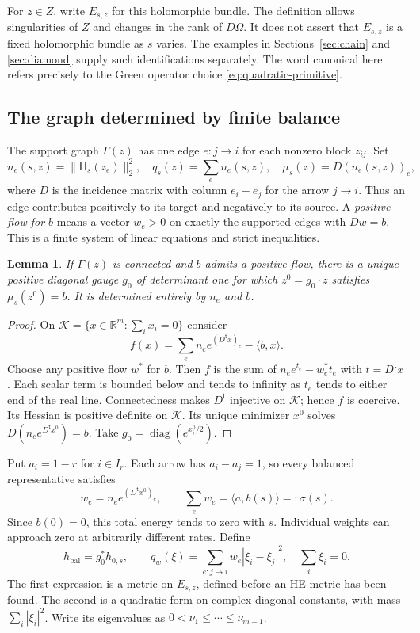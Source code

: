 \documentclass[11pt]{amsart}
\newtheorem{lemma}[theorem]{Lemma}
\theoremstyle{definition}
\theoremstyle{remark}
\newcommand{\RR}{\mathbb R}
\newcommand{\diag}{\operatorname{diag}}
\newcommand{\HH}{\mathsf H}
\newcommand{\cK}{\mathcal K}
\begin{document}
For $z\in Z$, write $E_{s,z}$ for this holomorphic bundle. The definition
allows singularities of $Z$ and changes in the rank of $D\Omega$. It does
not assert that $E_{s,z}$ is a fixed holomorphic bundle as $s$ varies.
The examples in Sections~\ref{sec:chain} and \ref{sec:diamond} supply
such identifications separately. The word canonical here refers precisely
to the Green operator choice \eqref{eq:quadratic-primitive}.

\subsection{The graph determined by finite balance}
The support graph $\Gamma(z)$ has one edge $e:j\to i$ for each nonzero
block $z_{ij}$. Set
\[
 n_e(s,z)=\|\HH_s(z_e)\|_2^2,\quad q_s(z)=\sum_en_e(s,z),
 \quad \mu_s(z)=D(n_e(s,z))_e,
\]
where $D$ is the incidence matrix with column $e_i-e_j$ for the arrow
$j\to i$. Thus an edge contributes positively to its target and negatively
to its source. A \emph{positive flow for $b$} means a vector $w_e>0$ on
exactly the supported edges with $Dw=b$. This is a finite system of
linear equations and strict inequalities.

\begin{lemma}\label{lem:balance}
If $\Gamma(z)$ is connected and $b$ admits a positive flow, there is a
unique positive diagonal gauge $g_0$ of determinant one for which
$z^0=g_0\cdot z$ satisfies $\mu_s(z^0)=b$. It is determined entirely
by $n_e$ and $b$.
\end{lemma}

\begin{proof}
On $\cK=\{x\in\RR^m:\sum_ix_i=0\}$ consider
\[
 f(x)=\sum_en_e e^{(D^{\mathsf t}x)_e}-\langle b,x\rangle.
\]
Choose any positive flow $w^*$ for $b$. Then $f$ is the sum of
$n_e e^{t_e}-w_e^*t_e$ with $t=D^{\mathsf t}x$. Each scalar term is
bounded below and tends to infinity as $t_e$ tends to either end of the
real line. Connectedness makes $D^{\mathsf t}$ injective on $\cK$;
hence $f$ is coercive. Its Hessian is positive definite on $\cK$.
Its unique minimizer $x^0$ solves $D(n_e e^{D^{\mathsf t}x^0})=b$.
Take $g_0=\diag(e^{x_i^0/2})$.
\end{proof}

Put $a_i=1-r$ for $i\in I_r$. Each arrow has
$a_i-a_j=1$, so every balanced representative satisfies
\begin{equation}\label{eq:total-energy}
 w_e=n_e e^{(D^{\mathsf t}x^0)_e},\qquad
 \sum_ew_e=\langle a,b(s)\rangle=:\sigma(s).
\end{equation}
Since $b(0)=0$, this total energy tends to zero with $s$. Individual
weights can approach zero at arbitrarily different rates. Define
\begin{equation}\label{eq:balanced-metric}
 h_{\mathrm{bal}}=g_0^*h_{0,s},\qquad
 q_w(\xi)=\sum_{e:j\to i}w_e|\xi_i-\xi_j|^2,
 \quad \sum_i\xi_i=0.
\end{equation}
The first expression is a metric on $E_{s,z}$, defined before an HE
metric has been found. The second is a quadratic form on complex diagonal
constants, with mass $\sum_i|\xi_i|^2$. Write its eigenvalues as
$0<\nu_1\le\cdots\le\nu_{m-1}$.
\end{document}
